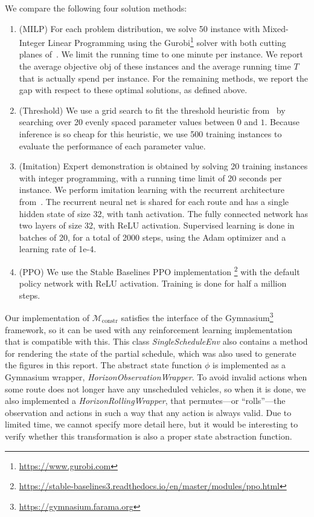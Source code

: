 \documentclass{report}
\theoremstyle{definition}
\theoremstyle{plain}
\begin{document}
We compare the following four solution methods:
\begin{enumerate}
  \item (MILP) For each problem distribution, we solve 50 instance with
        Mixed-Integer Linear Programming using the
        Gurobi\footnote{\url{https://www.gurobi.com}} solver with both cutting
        planes of~. We limit the running time to one minute per
        instance. We report the average objective $\mathrm{obj}$ of these
        instances and the average running time $T$ that is actually spend per
        instance. For the remaining methods, we report the gap with respect to
        these optimal solutions, as defined above.

  \item (Threshold) We use a grid search to fit the threshold heuristic
        from~ by searching over 20 evenly spaced parameter
        values between $0$ and $1$. Because inference is so cheap for this
        heuristic, we use 500 training instances to evaluate the performance of
        each parameter value.

  \item (Imitation) Expert demonstration is obtained by solving 20 training
        instances with integer programming, with a running time limit of 20
        seconds per instance.
        We perform imitation learning with the recurrent architecture
        from~. The recurrent neural net is shared for
        each route and has a single hidden state of size 32, with tanh
        activation. The fully connected network has two layers of size 32, with
        ReLU activation.
        Supervised learning is done in batches of 20, for a total of 2000 steps,
        using the Adam optimizer and a learning rate of 1e-4.

  \item (PPO) We use the Stable Baselines PPO implementation%
        \footnote{\url{https://stable-baselines3.readthedocs.io/en/master/modules/ppo.html}}
        with the default policy network with ReLU activation.
        Training is done for half a million steps.
\end{enumerate}

Our implementation of $\mathcal{M}_\textrm{constr}$ satisfies the interface of
the Gymnasium\footnote{\url{https://gymnasium.farama.org}} framework, so it can
be used with any reinforcement learning implementation that is compatible with
this.
%
This class \emph{SingleScheduleEnv} also contains a method for rendering the state of
the partial schedule, which was also used to generate the figures in this
report.
%
The abstract state function $\phi$ is implemented as a Gymnasium wrapper,
\emph{HorizonObservationWrapper}.
%
To avoid invalid actions when some route does not longer have any unscheduled
vehicles, so when it is done, we also implemented a
\emph{HorizonRollingWrapper}, that permutes---or ``rolls''---the observation and
actions in such a way that any action is always valid.
%
Due to limited time, we cannot specify more detail here, but it would be
interesting to verify whether this transformation is also a proper state
abstraction function.
\end{document}
